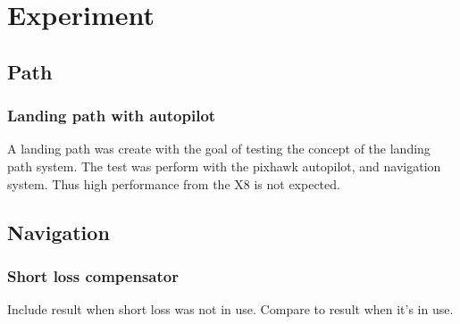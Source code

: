 \chapter{Experiment}
\section{Path}
\subsection{Landing path with autopilot}
A landing path was create with the goal of testing the concept of the landing path system. The test was perform with the pixhawk autopilot, and navigation system. Thus high performance from the X8 is not expected.
\section{Navigation}
\subsection{Short loss compensator}
Include result when short loss was not in use. Compare to result when it's in use.